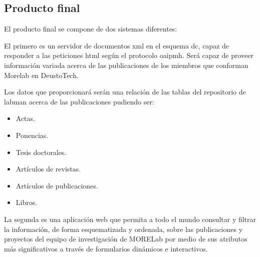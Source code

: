 \subsection{Producto final}

El producto final se compone de dos sistemas diferentes:

El primero es un servidor de documentos \acrshort{xml}\cite{XML} en el esquema \acrshort{dc}, capaz de responder a las peticiones \acrshort{html} según el protocolo \acrshort{oaipmh}. Será capaz de proveer información variada acerca de las publicaciones de los miembros que conforman Morelab en DeustoTech.

Los datos que proporcionará serán una relación de las tablas del repositorio de \acrshort{labman} acerca de las publicaciones pudiendo ser:

\begin{itemize}
	\item Actas.
	\item Ponencias.
	\item Tesis doctorales.
	\item Artículos de revistas.
	\item Artículos de publicaciones.
	\item Libros.

\end{itemize}

La segunda es una aplicación web que permita a todo el mundo consultar y filtrar la información, de forma esquematizada y ordenada, sobre las publicaciones y proyectos del equipo de investigación de MORELab por medio de sus atributos más significativos a través de formularios dinámicos e interactivos.
